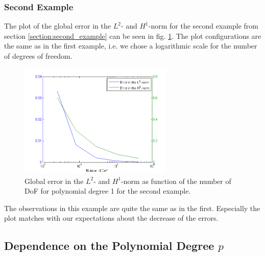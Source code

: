 \documentclass[a4paper, 11pt, twoside]{article}
\begin{document}
\subsubsection{Second Example}
The plot of the global error in the $L^2$- and $H^1$-norm for the second example from section \ref{section:second_example} can be seen in fig. \ref{H^1_error_example2}. The plot configurations are the same as in the first example, i.e. we chose a logarithmic scale for the number of degrees of freedom.
\begin{figure}[htb]
  \centering      
  \includegraphics[width=0.65\textwidth]{fig/errorf2.png}
\caption{Global error in the $L^2$- and $H^1$-norm as function of the number of DoF for polynomial degree 1 for the second example.}
\label{H^1_error_example2}
\end{figure}
The observations in this example are quite the same as in the first. Especially the plot matches with our expectations about the decrease of the errors.

\subsection{Dependence on the Polynomial Degree $p$}
\end{document}

